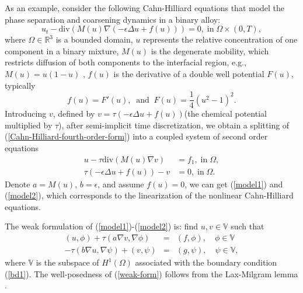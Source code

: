 \documentclass[smallcondensed]{svjour3}
\numberwithin{equation}{section} \numberwithin{table}{section}
\numberwithin{figure}{section}
\numberwithin{algorithm}{section}
\begin{document}
As an example, consider the following Cahn-Hilliard equations that model the phase separation and coarsening dynamics in a binary alloy:
\begin{equation}
u_t-\mbox{div} (M(u)\nabla (-\epsilon\Delta u+f(u))) = 0,\;\mbox{in}\;\Omega\times (0, T),
\label{Cahn-Hilliard-fourth-order-form}
\end{equation}
where $\Omega\in \mathbb{R}^3$ is a bounded domain, $u$ represents the relative concentration of one component in a binary mixture, $M(u)$ is the degenerate mobility, which restricts diffusion of both components to the interfacial region, e.g., $M(u) = u(1-u)$ \cite{barrett1999finite}, $f(u)$ is the derivative of a double well potential $F(u)$, typically
$$
f(u) = F'(u), \;\;\text{and}\;\;F(u) = \frac{1}{4} (u^2-1)^2.
$$
Introducing $v$, defined by $v = \tau(-\epsilon \Delta u + f(u))$(the chemical potential multiplied by $\tau$), after semi-implicit time discretization, we obtain a splitting of (\ref{Cahn-Hilliard-fourth-order-form}) into a coupled system of second order equations \cite{elliott1989second, elliott1992error,feng2004error}
\begin{align*}
u - \tau\mbox{div}(M(u)\nabla v)& = f_1,\;\mbox{in}\;\Omega,\\ 
\tau(-\epsilon \Delta u + f(u)) - v& = 0,\;\mbox{in}\;\Omega.
\end{align*}
Denote $a=M(u)$, $b=\epsilon$, and assume $f(u)=0$, we can get (\ref{model1}) and (\ref{model2}), which corresponds to the linearization of the nonlinear Cahn-Hilliard equations.

The weak formulation of (\ref{model1})-(\ref{model2}) is: find $u,v\in\mathbb{V}$ such that
\begin{equation}
\begin{array}{ccc}
(u,\phi)+\tau(a\nabla v, \nabla \phi) & = &(f,\phi),\quad \phi\in\mathbb{V}\\
-\tau(b\nabla u, \nabla\psi) + (v,\psi) & = & (g,\psi),\quad \psi\in\mathbb{V},
\end{array}
\label{weak-form}
\end{equation}
where $\mathbb{V}$ is the subspace of $H^1(\Omega)$ associated with the boundary condition (\ref{bd1}). The well-posedness of (\ref{weak-form}) follows from the Lax-Milgram lemma \cite{quarteroni1980mixed}.
\end{document}
